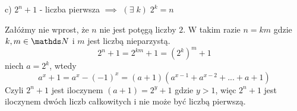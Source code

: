 \documentclass{article}[13pt]
\begin{document}
{\color{def}c) $2^n+1$ - liczba pierwsza $\implies$ $(\exists\;k)\;2^k=n$}
\medskip

Załóżmy nie wprost, że $n$ nie jest potęgą liczby $2$. W takim razie $n=km$ gdzie $k,m\in\N$ i $m$ jest liczbą nieparzystą.
$$2^n+1=2^{km}+1=(2^k)^m+1$$
niech $a=2^k$, wtedy
$$a^x+1=a^x-(-1)^x=(a+1)(a^{x-1}+a^{x-2}+...+a+1)$$
Czyli $2^n+1$ jest iloczynem $(a+1)=2^y+1$ gdzie $y>1$, więc $2^n+1$ jest iloczynem dwóch liczb całkowitych i nie może być liczbą pierwszą.
\end{document}
